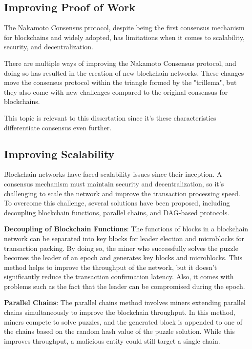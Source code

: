\subsection*{Improving Proof of Work}

The Nakamoto Consensus protocol, despite being the first consensus mechanism for blockchains and widely adopted, has limitations when it comes to scalability, security, and decentralization.

There are multiple ways of improving the Nakamoto Consensus protocol, and doing so has resulted in the creation of new blockchain networks. These changes move the consensus protocol within the triangle formed by the "trillema", but they also come with new challenges compared to the original consensus for blockchains.

This topic is relevant to this dissertation since it's these characteristics differentiate consensus even further.

\subsection*{Improving Scalability}
Blockchain networks have faced scalability issues since their inception. A consensus mechanism must maintain security and decentralization, so it's challenging to scale the network and improve the transaction processing speed. To overcome this challenge, several solutions have been proposed, including decoupling blockchain functions, parallel chains, and DAG-based protocols.

\textbf{Decoupling of Blockchain Functions}: The functions of blocks in a blockchain network can be separated into key blocks for leader election and microblocks for transaction packing. By doing so, the miner who successfully solves the puzzle becomes the leader of an epoch and generates key blocks and microblocks. This method helps to improve the throughput of the network, but it doesn't significantly reduce the transaction confirmation latency. Also, it comes with problems such as the fact that the leader can be compromised during the epoch.

\textbf{Parallel Chains}: The parallel chains method involves miners extending parallel chains simultaneously to improve the blockchain throughput. In this method, miners compete to solve puzzles, and the generated block is appended to one of the chains based on the random hash value of the puzzle solution. While this improves throughput, a malicious entity could still target a single chain.

